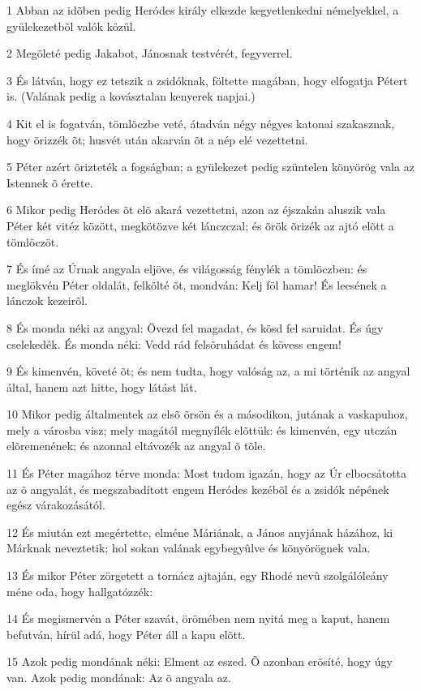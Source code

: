 \par 1 Abban az idõben pedig Heródes király elkezde kegyetlenkedni némelyekkel, a gyülekezetbõl valók közül.
\par 2 Megöleté pedig Jakabot, Jánosnak testvérét, fegyverrel.
\par 3 És látván, hogy ez tetszik a zsidóknak, föltette magában, hogy elfogatja Pétert is. (Valának pedig a kovásztalan kenyerek napjai.)
\par 4 Kit el is fogatván, tömlöczbe veté, átadván négy négyes katonai szakasznak, hogy õrizzék õt; husvét után akarván õt a nép elé vezettetni.
\par 5 Péter azért õrizteték a fogságban; a gyülekezet pedig szüntelen könyörög vala az Istennek õ érette.
\par 6 Mikor pedig Heródes õt elõ akará vezettetni, azon az éjszakán aluszik vala Péter két vitéz között, megkötözve két lánczczal; és õrök õrizék az ajtó elõtt a tömlöczöt.
\par 7 És ímé az Úrnak angyala eljöve, és világosság fénylék a tömlöczben: és meglökvén Péter oldalát, felkölté õt, mondván: Kelj föl hamar! És leesének a lánczok kezeirõl.
\par 8 És monda néki az angyal: Övezd fel magadat, és kösd fel saruidat. És úgy cselekedék. És monda néki: Vedd rád felsõruhádat és kövess engem!
\par 9 És kimenvén, követé õt; és nem tudta, hogy valóság az, a mi történik az angyal által, hanem azt hitte, hogy látást lát.
\par 10 Mikor pedig általmentek az elsõ õrsön és a másodikon, jutának a vaskapuhoz, mely a városba visz; mely magától megnyílék elõttük: és kimenvén, egy utczán elõremenének; és azonnal eltávozék az angyal õ tõle.
\par 11 És Péter magához térve monda: Most tudom igazán, hogy az Úr elbocsátotta az õ angyalát, és megszabadított engem Heródes kezébõl és a zsidók népének egész várakozásától.
\par 12 És miután ezt megértette, elméne Máriának, a János anyjának házához, ki Márknak neveztetik; hol sokan valának egybegyûlve és könyörögnek vala.
\par 13 És mikor Péter zörgetett a tornácz ajtaján, egy Rhodé nevû szolgálóleány méne oda, hogy hallgatózzék:
\par 14 És megismervén a Péter szavát, örömében nem nyitá meg a kaput, hanem befutván, hírül adá, hogy Péter áll a kapu elõtt.
\par 15 Azok pedig mondának néki: Elment az eszed. Õ azonban erõsíté, hogy úgy van. Azok pedig mondának: Az õ angyala az.
